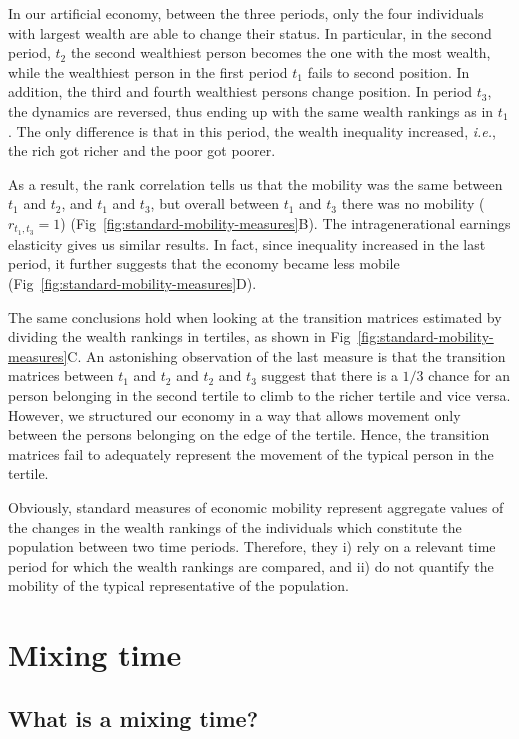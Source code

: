 \documentclass[11pt]{article}
\newcommand{\ie}{{\it i.e.}\xspace}
\numberwithin{equation}{section}
\begin{document}
In our artificial economy, between the three periods, only the four individuals with largest wealth are able to change their status. In particular, in the second period, $t_2$ the second wealthiest person becomes the one with the most wealth, while the wealthiest person in the first period $t_1$ fails to second position. In addition, the third and fourth wealthiest persons change position. In period $t_3$, the dynamics are reversed, thus ending up with the same wealth rankings as in $t_1$. The only difference is that in this period, the wealth inequality increased, \ie, the rich got richer and the poor got poorer. 

As a result, the rank correlation tells us that the mobility was the same between $t_1$ and $t_2$, and $t_1$ and $t_3$, but overall between $t_1$ and $t_3$ there was no mobility ($r_{t_1,t_3} = 1$) (Fig~\ref{fig:standard-mobility-measures}B). The intragenerational earnings elasticity gives us similar results. In fact, since inequality increased in the last period, it further suggests that the economy became less mobile (Fig~\ref{fig:standard-mobility-measures}D). 

The same conclusions hold when looking at the transition matrices estimated by dividing the wealth rankings in tertiles, as shown in Fig~\ref{fig:standard-mobility-measures}C. An astonishing observation of the last measure is that the transition matrices between $t_1$ and $t_2$ and $t_2$ and $t_3$ suggest that there is a $1/3$ chance for an person belonging in the second tertile to climb to the richer tertile and vice versa. However, we structured our economy in a way that allows movement only between the persons belonging on the edge of the tertile. Hence, the transition matrices fail to adequately represent the movement of the typical person in the tertile.

Obviously, standard measures of economic mobility represent aggregate values of the changes in the wealth rankings of the individuals which constitute the population between two time periods. Therefore, they i) rely on a relevant time period for which the wealth rankings are compared, and ii) do not quantify the mobility of the typical representative of the population.

\section{Mixing time}

\subsection{What is a mixing time?}\label{sec:what}
\end{document}
